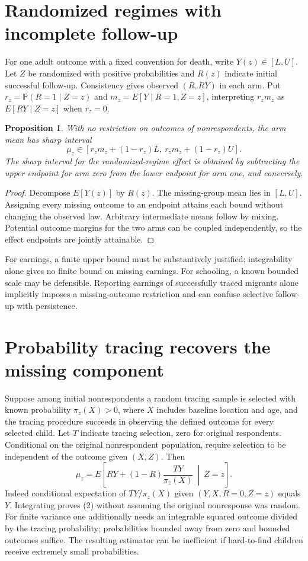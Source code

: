 \documentclass[11pt,a4paper]{article}
\newtheorem{proposition}[theorem]{Proposition}
\newcommand{\Prob}{\mathbb P}
\begin{document}
\section{Randomized regimes with incomplete follow-up}
For one adult outcome with a fixed convention for death, write $Y(z)\in[L,U]$. Let $Z$ be randomized with positive probabilities and $R(z)$ indicate initial successful follow-up. Consistency gives observed $(R,RY)$ in each arm. Put $r_z=\Prob(R=1\mid Z=z)$ and $m_z=E[Y\mid R=1,Z=z]$, interpreting $r_zm_z$ as $E[RY\mid Z=z]$ when $r_z=0$.
\begin{proposition}
With no restriction on outcomes of nonrespondents, the arm mean has sharp interval
\[
 \mu_z\in[r_zm_z+(1-r_z)L,\ r_zm_z+(1-r_z)U].
\]
The sharp interval for the randomized-regime effect is obtained by subtracting the upper endpoint for arm zero from the lower endpoint for arm one, and conversely.
\end{proposition}
\begin{proof}
Decompose $E[Y(z)]$ by $R(z)$. The missing-group mean lies in $[L,U]$. Assigning every missing outcome to an endpoint attains each bound without changing the observed law. Arbitrary intermediate means follow by mixing. Potential outcome margins for the two arms can be coupled independently, so the effect endpoints are jointly attainable.
\end{proof}
For earnings, a finite upper bound must be substantively justified; integrability alone gives no finite bound on missing earnings. For schooling, a known bounded scale may be defensible. Reporting earnings of successfully traced migrants alone implicitly imposes a missing-outcome restriction and can confuse selective follow-up with persistence.

\section{Probability tracing recovers the missing component}
Suppose among initial nonrespondents a random tracing sample is selected with known probability $\pi_z(X)>0$, where $X$ includes baseline location and age, and the tracing procedure succeeds in observing the defined outcome for every selected child. Let $T$ indicate tracing selection, zero for original respondents. Conditional on the original nonrespondent population, require selection to be independent of the outcome given $(X,Z)$. Then
\[
 \mu_z=E\left[RY+(1-R)\frac{TY}{\pi_z(X)}\ \middle|\ Z=z\right].
\tag{2}
\]
Indeed conditional expectation of $TY/\pi_z(X)$ given $(Y,X,R=0,Z=z)$ equals $Y$. Integrating proves (2) without assuming the original nonresponse was random. For finite variance one additionally needs an integrable squared outcome divided by the tracing probability; probabilities bounded away from zero and bounded outcomes suffice. The resulting estimator can be inefficient if hard-to-find children receive extremely small probabilities.
\end{document}
